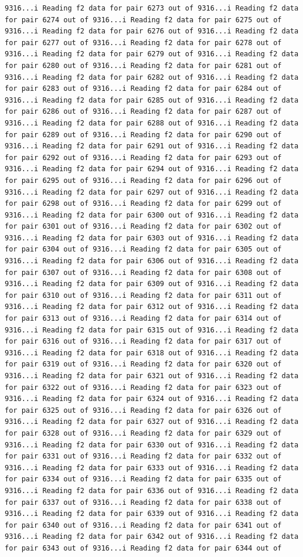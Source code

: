 \documentclass[
]{article}
\begin{document}
\begin{verbatim}
9316...i Reading f2 data for pair 6273 out of 9316...i Reading f2 data for pair 6274 out of 9316...i Reading f2 data for pair 6275 out of 9316...i Reading f2 data for pair 6276 out of 9316...i Reading f2 data for pair 6277 out of 9316...i Reading f2 data for pair 6278 out of 9316...i Reading f2 data for pair 6279 out of 9316...i Reading f2 data for pair 6280 out of 9316...i Reading f2 data for pair 6281 out of 9316...i Reading f2 data for pair 6282 out of 9316...i Reading f2 data for pair 6283 out of 9316...i Reading f2 data for pair 6284 out of 9316...i Reading f2 data for pair 6285 out of 9316...i Reading f2 data for pair 6286 out of 9316...i Reading f2 data for pair 6287 out of 9316...i Reading f2 data for pair 6288 out of 9316...i Reading f2 data for pair 6289 out of 9316...i Reading f2 data for pair 6290 out of 9316...i Reading f2 data for pair 6291 out of 9316...i Reading f2 data for pair 6292 out of 9316...i Reading f2 data for pair 6293 out of 9316...i Reading f2 data for pair 6294 out of 9316...i Reading f2 data for pair 6295 out of 9316...i Reading f2 data for pair 6296 out of 9316...i Reading f2 data for pair 6297 out of 9316...i Reading f2 data for pair 6298 out of 9316...i Reading f2 data for pair 6299 out of 9316...i Reading f2 data for pair 6300 out of 9316...i Reading f2 data for pair 6301 out of 9316...i Reading f2 data for pair 6302 out of 9316...i Reading f2 data for pair 6303 out of 9316...i Reading f2 data for pair 6304 out of 9316...i Reading f2 data for pair 6305 out of 9316...i Reading f2 data for pair 6306 out of 9316...i Reading f2 data for pair 6307 out of 9316...i Reading f2 data for pair 6308 out of 9316...i Reading f2 data for pair 6309 out of 9316...i Reading f2 data for pair 6310 out of 9316...i Reading f2 data for pair 6311 out of 9316...i Reading f2 data for pair 6312 out of 9316...i Reading f2 data for pair 6313 out of 9316...i Reading f2 data for pair 6314 out of 9316...i Reading f2 data for pair 6315 out of 9316...i Reading f2 data for pair 6316 out of 9316...i Reading f2 data for pair 6317 out of 9316...i Reading f2 data for pair 6318 out of 9316...i Reading f2 data for pair 6319 out of 9316...i Reading f2 data for pair 6320 out of 9316...i Reading f2 data for pair 6321 out of 9316...i Reading f2 data for pair 6322 out of 9316...i Reading f2 data for pair 6323 out of 9316...i Reading f2 data for pair 6324 out of 9316...i Reading f2 data for pair 6325 out of 9316...i Reading f2 data for pair 6326 out of 9316...i Reading f2 data for pair 6327 out of 9316...i Reading f2 data for pair 6328 out of 9316...i Reading f2 data for pair 6329 out of 9316...i Reading f2 data for pair 6330 out of 9316...i Reading f2 data for pair 6331 out of 9316...i Reading f2 data for pair 6332 out of 9316...i Reading f2 data for pair 6333 out of 9316...i Reading f2 data for pair 6334 out of 9316...i Reading f2 data for pair 6335 out of 9316...i Reading f2 data for pair 6336 out of 9316...i Reading f2 data for pair 6337 out of 9316...i Reading f2 data for pair 6338 out of 9316...i Reading f2 data for pair 6339 out of 9316...i Reading f2 data for pair 6340 out of 9316...i Reading f2 data for pair 6341 out of 9316...i Reading f2 data for pair 6342 out of 9316...i Reading f2 data for pair 6343 out of 9316...i Reading f2 data for pair 6344 out of 
\end{verbatim}
\end{document}
